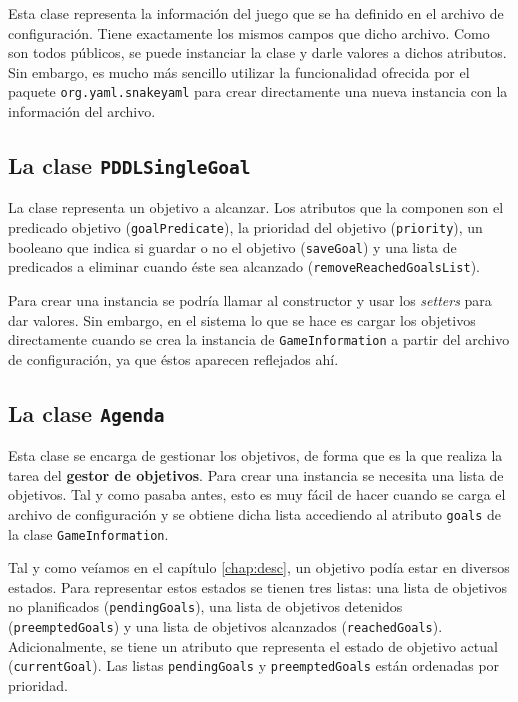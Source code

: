 Esta clase representa la información del juego que se ha definido en el archivo de configuración.
Tiene exactamente los mismos campos que dicho archivo. Como son todos públicos, se puede instanciar
la clase y darle valores a dichos atributos. Sin embargo, es mucho más sencillo utilizar la funcionalidad
ofrecida por el paquete \texttt{org.yaml.snakeyaml} para crear directamente una nueva instancia con
la información del archivo.

\subsection{La clase \texttt{PDDLSingleGoal}}

La clase representa un objetivo a alcanzar. Los atributos que la componen son el predicado
objetivo (\texttt{goalPredicate}), la prioridad del objetivo (\texttt{priority}), un booleano
que indica si guardar o no el objetivo (\texttt{saveGoal}) y una lista de predicados a eliminar
cuando éste sea alcanzado (\texttt{removeReachedGoalsList}).

Para crear una instancia se podría llamar al constructor y usar los \textit{setters} para dar valores.
Sin embargo, en el sistema lo que se hace es cargar los objetivos directamente cuando se crea la
instancia de \texttt{GameInformation} a partir del archivo de configuración, ya que éstos aparecen reflejados
ahí.

\subsection{La clase \texttt{Agenda}}

Esta clase se encarga de gestionar los objetivos, de forma que es la que realiza la tarea del
\textbf{gestor de objetivos}. Para crear una instancia se necesita una lista de objetivos. Tal
y como pasaba antes, esto es muy fácil de hacer cuando se carga el archivo de configuración y
se obtiene dicha lista accediendo al atributo \texttt{goals} de la clase \texttt{GameInformation}.

Tal y como veíamos en el capítulo \ref{chap:desc}, un objetivo podía estar en diversos estados.
Para representar estos estados se tienen tres listas: una lista de objetivos no planificados
(\texttt{pendingGoals}), una lista de objetivos detenidos (\texttt{preemptedGoals}) y una lista
de objetivos alcanzados (\texttt{reachedGoals}). Adicionalmente, se tiene un atributo que representa
el estado de objetivo actual (\texttt{currentGoal}). Las listas \texttt{pendingGoals} y
\texttt{preemptedGoals} están ordenadas por prioridad.

